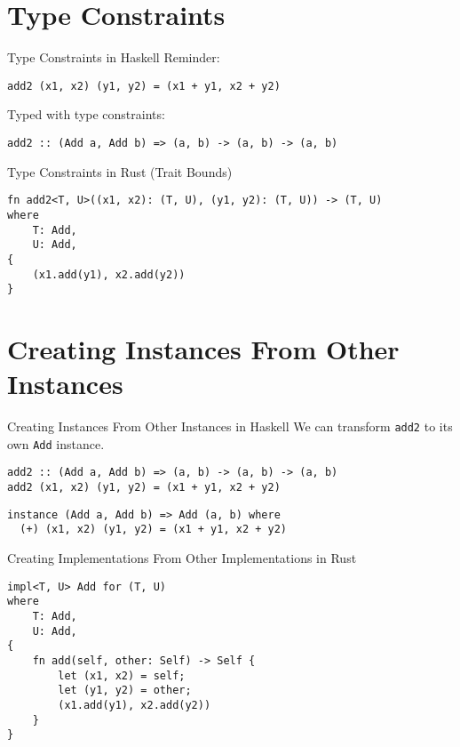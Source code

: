 \documentclass[
  english,            %
  aspectratio=169,    %
]{tumbeamer}
\begin{document}
\section{Type Constraints}

\begin{frame}[fragile]{Type Constraints in Haskell}
Reminder:
\begin{verbatim}
add2 (x1, x2) (y1, y2) = (x1 + y1, x2 + y2)
\end{verbatim}

\pause \vspace{3mm}

Typed with type constraints:
\begin{verbatim}
add2 :: (Add a, Add b) => (a, b) -> (a, b) -> (a, b)
\end{verbatim}
\end{frame}

\begin{frame}[fragile]{Type Constraints in Rust (Trait Bounds)}
\begin{verbatim}
fn add2<T, U>((x1, x2): (T, U), (y1, y2): (T, U)) -> (T, U)
where
    T: Add,
    U: Add,
{
    (x1.add(y1), x2.add(y2))
}
\end{verbatim}
\end{frame}

\section{Creating Instances From Other Instances}

\begin{frame}[fragile]{Creating Instances From Other Instances in Haskell}
We can transform \texttt{add2} to its own \texttt{Add} instance.
\begin{verbatim}
add2 :: (Add a, Add b) => (a, b) -> (a, b) -> (a, b)
add2 (x1, x2) (y1, y2) = (x1 + y1, x2 + y2)
\end{verbatim}

\pause \vspace{6mm}

\begin{verbatim}
instance (Add a, Add b) => Add (a, b) where
  (+) (x1, x2) (y1, y2) = (x1 + y1, x2 + y2)
\end{verbatim}
\end{frame}

\begin{frame}[fragile]{Creating Implementations From Other Implementations in Rust}
\begin{verbatim}
impl<T, U> Add for (T, U)
where
    T: Add,
    U: Add,
{
    fn add(self, other: Self) -> Self {
        let (x1, x2) = self;
        let (y1, y2) = other;
        (x1.add(y1), x2.add(y2))
    }
}
\end{verbatim}
\end{frame}
\end{document}

